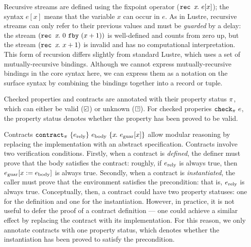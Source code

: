 Recursive streams are defined using the fixpoint operator ($\texttt{rec~} x\hspace{-0.1em}.~e[x]$); the syntax $e[x]$ means that the variable $x$ can occur in $e$.
As in Lustre, recursive streams can only refer to their previous values and must be \emph{guarded} by a delay: the stream $(\texttt{rec~} x\hspace{-0.1em}.~0~\texttt{fby}~(x + 1))$ is well-defined and counts from zero up, but the stream $(\texttt{rec~} x\hspace{-0.1em}.~x + 1)$ is invalid and has no computational interpretation.
This form of recursion differs slightly from standard Lustre, which uses a set of mutually-recursive bindings.
Although we cannot express mutually-recursive bindings in the core syntax here, we can express them as a notation on the surface syntax by combining the bindings together into a record or tuple.

Checked properties and contracts are annotated with their property status $\pi$, which can either be valid ($\PSValid$) or unknown ($\PSUnknown$).
For checked properies $\texttt{check}_{\pi}~e$, the property status denotes whether the property has been proved to be valid.

Contracts $\texttt{contract}_{\pi}~\{e_{\text{rely}}\}~e_{\text{body}}~\{x\hspace{-0.1em}.~e_{\text{guar}}[x]\}$ allow modular reasoning by replacing the implementation with an abstract specification.
Contracts involve two verification conditions.
Firstly, when a contract is \emph{defined}, the definer must prove that the body satisfies the contract: roughly, if $e_{\text{rely}}$ is always true, then $e_{\text{guar}}[x := e_{\text{body}}]$ is always true.
Secondly, when a contract is \emph{instantiated}, the caller must prove that the environment satisfies the precondition: that is, $e_{\text{rely}}$ is always true.
Conceptually, then, a contract could have two property statuses: one for the definition and one for the instantiation.
However, in practice, it is not useful to defer the proof of a contract definition --- one could achieve a similar effect by replacing the contract with its implementation.
For this reason, we only annotate contracts with one property status, which denotes whether the instantiation has been proved to satisfy the precondition.

